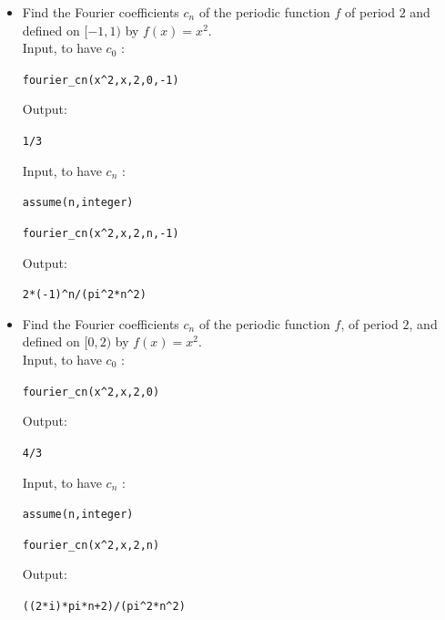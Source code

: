 \documentclass[a4paper,11pt]{book}
\begin{document}
\begin{itemize}
\item Find the Fourier coefficients $c_n$ of the periodic function $f$ of
period $2$ and  defined on $[-1,1)$ by $ f(x)=x^2$.\\ 
Input, to have $c_0$ :
\begin{center}{\tt fourier\_cn(x\verb|^|2,x,2,0,-1)}\end{center}
Output:
\begin{center}{\tt 1/3}\end{center}
Input, to have $c_n$ :
\begin{center}{\tt assume(n,integer)}\end{center}
\begin{center}{\tt fourier\_cn(x\verb|^|2,x,2,n,-1)}\end{center}
Output:
\begin{center}{\tt 2*(-1)\verb|^|n/(pi\verb|^|2*n\verb|^|2)}\end{center}

\item Find the Fourier coefficients $c_n$ of the periodic function $f$, of 
period $2$, and defined on $[0,2)$ by $ f(x)=x^2$.\\ 
Input,  to have $c_0$ :
\begin{center}{\tt fourier\_cn(x\verb|^|2,x,2,0)}\end{center}
Output:
\begin{center}{\tt 4/3}\end{center}
Input, to have $c_n$ :
\begin{center}{\tt assume(n,integer)}\end{center}
\begin{center}{\tt fourier\_cn(x\verb|^|2,x,2,n)}\end{center}
Output:
\begin{center}{\tt ((2*i)*pi*n+2)/(pi\verb|^|2*n\verb|^|2)}\end{center}


\end{itemize}
\end{document}
